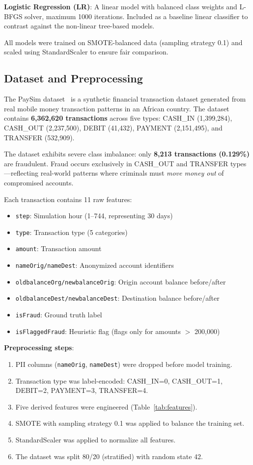 \documentclass[conference]{IEEEtran}
\begin{document}
\textbf{Logistic Regression (LR)}: A linear model with balanced class weights and L-BFGS solver, maximum 1000 iterations. Included as a baseline linear classifier to contrast against the non-linear tree-based models.

All models were trained on SMOTE-balanced data (sampling strategy 0.1) and scaled using StandardScaler to ensure fair comparison.

\subsection{Dataset and Preprocessing}
The PaySim dataset~\cite{lopezrojas2016} is a synthetic financial transaction dataset generated from real mobile money transaction patterns in an African country. The dataset contains \textbf{6,362,620 transactions} across five types: CASH\_IN (1,399,284), CASH\_OUT (2,237,500), DEBIT (41,432), PAYMENT (2,151,495), and TRANSFER (532,909).

The dataset exhibits severe class imbalance: only \textbf{8,213 transactions (0.129\%)} are fraudulent. Fraud occurs exclusively in CASH\_OUT and TRANSFER types—reflecting real-world patterns where criminals must \emph{move money out} of compromised accounts.

Each transaction contains 11 raw features:
\begin{itemize}
    \item \texttt{step}: Simulation hour (1--744, representing 30 days)
    \item \texttt{type}: Transaction type (5 categories)
    \item \texttt{amount}: Transaction amount
    \item \texttt{nameOrig/nameDest}: Anonymized account identifiers
    \item \texttt{oldbalanceOrg/newbalanceOrig}: Origin account balance before/after
    \item \texttt{oldbalanceDest/newbalanceDest}: Destination balance before/after
    \item \texttt{isFraud}: Ground truth label
    \item \texttt{isFlaggedFraud}: Heuristic flag (flags only for amounts $>$ 200,000)
\end{itemize}

\textbf{Preprocessing steps}:
\begin{enumerate}
    \item PII columns (\texttt{nameOrig}, \texttt{nameDest}) were dropped before model training.
    \item Transaction type was label-encoded: CASH\_IN=0, CASH\_OUT=1, DEBIT=2, PAYMENT=3, TRANSFER=4.
    \item Five derived features were engineered (Table~\ref{tab:features}).
    \item SMOTE with sampling strategy 0.1 was applied to balance the training set.
    \item StandardScaler was applied to normalize all features.
    \item The dataset was split 80/20 (stratified) with random state 42.
\end{enumerate}
\end{document}
